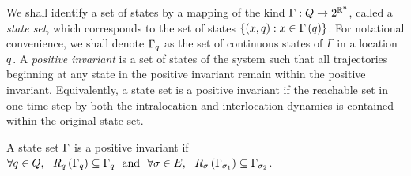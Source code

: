 We shall identify a set of states by a mapping of the kind
$\Gamma:Q\rightarrow 2^{\mathbb{R}^n}$, called a \emph{state
set}, which corresponds to the set of states
$\left\{\left(x,q\right):x\in\Gamma\left(q\right)\right\}$.  For notational
convenience, we shall denote $\Gamma_q$ as the set of continuous
states of $\Gamma$ in a location $q$.  A \emph{positive invariant}
is a set of states of the system such that all trajectories beginning
at any state in the positive invariant remain within the positive
invariant.  Equivalently, a state set is a positive invariant if the
reachable set in one time step by both the intralocation and
interlocation dynamics is contained within the original state set.
\begin{definition}
A state set $\Gamma$ is a positive invariant if
$\forall q\in Q,~~R_{q}\left(\Gamma_q\right) \subseteq \Gamma_q~\label{eqn:pi1}~\text{and}~~
 \forall\sigma\in E,~~R_{\sigma}\left(\Gamma_{\sigma_{1}}\right) \subseteq
  \Gamma_{\sigma_{2}}$.
\end{definition}
